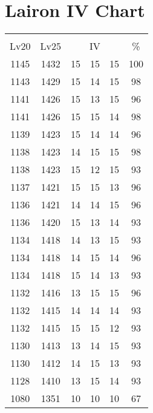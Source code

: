 \documentclass{article}%
\begin{document}
%
\normalsize%
\section{Lairon IV Chart}%
\label{sec:Lairon IV Chart}%
\renewcommand{\arraystretch}{1.5}%
\begin{tabular}{|c|c|c|c|c|c|}%
\hline%
\multicolumn{6}{|c|}{\textcolor{white}{ 
\linebreak{Lairon}
}%
\cellcolor{black}}\\%
\multicolumn{1}{|c}{Lv20}&\multicolumn{1}{c|}{Lv25}&\multicolumn{3}{c|}{IV}&\multicolumn{1}{|c|}{\%}\\%
\hline%
\rowcolor{color100}%
1145&1432&15&15&15&100\\%
\hline%
\rowcolor{color98}%
1143&1429&15&14&15&98\\%
\hline%
\rowcolor{color96}%
1141&1426&15&13&15&96\\%
\hline%
\rowcolor{color98}%
1141&1426&15&15&14&98\\%
\hline%
\rowcolor{color96}%
1139&1423&15&14&14&96\\%
\hline%
\rowcolor{color98}%
1138&1423&14&15&15&98\\%
\hline%
\rowcolor{color93}%
1138&1423&15&12&15&93\\%
\hline%
\rowcolor{color96}%
1137&1421&15&15&13&96\\%
\hline%
\rowcolor{color96}%
1136&1421&14&14&15&96\\%
\hline%
\rowcolor{color93}%
1136&1420&15&13&14&93\\%
\hline%
\rowcolor{color93}%
1134&1418&14&13&15&93\\%
\hline%
\rowcolor{color96}%
1134&1418&14&15&14&96\\%
\hline%
\rowcolor{color93}%
1134&1418&15&14&13&93\\%
\hline%
\rowcolor{color96}%
1132&1416&13&15&15&96\\%
\hline%
\rowcolor{color93}%
1132&1415&14&14&14&93\\%
\hline%
\rowcolor{color93}%
1132&1415&15&15&12&93\\%
\hline%
\rowcolor{color93}%
1130&1413&13&14&15&93\\%
\hline%
\rowcolor{color93}%
1130&1412&14&15&13&93\\%
\hline%
\rowcolor{color93}%
1128&1410&13&15&14&93\\%
\hline%
\rowcolor{color91}%
1080&1351&10&10&10&67\\%
\end{tabular}

%
\end{document}

